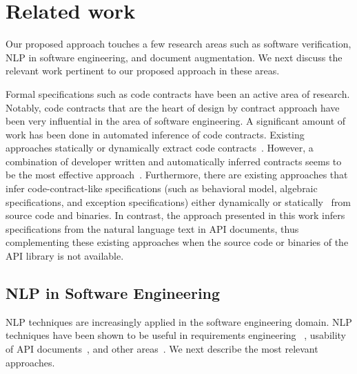 \section{Related work}
\label{sec:related}


Our proposed approach touches a few research areas such as software verification,
NLP in software engineering, and document augmentation.
We next discuss the relevant work pertinent to our proposed approach in these areas.

Formal specifications such as code contracts have been an active area of research. Notably, code contracts that are the heart of design by contract approach have been very influential in the area of software engineering.
A significant amount of work has been done in automated inference of code contracts.
Existing approaches statically or dynamically extract code contracts~\cite{csallner08dysy,NimmerE02:ISSTA,Tillmann:2006:DLM:2105385.2105433}. However, a combination of developer written and automatically inferred contracts seems to be the most effective approach~\cite{Polikarpova2009ISSTA,Flanagan2001:HAA}.
Furthermore, there are existing approaches that infer code-contract-like specifications
(such as behavioral model, algebraic specifications, and exception specifications) either dynamically\cite{Henkel07discoveringdocumentation,Ghezzi:2009:SIB:1555001.1555057,Henkel:2008:DDA:1363102.1363105} or statically~\cite{Flanagan2001:HAA,Buse:2008:ADI:1390630.1390664} from source code and binaries.
In contrast, the approach presented in this work infers specifications from the natural language text in API documents,
thus complementing these existing approaches when the source code or binaries of the API library is not available.


\subsection{NLP in Software Engineering}

NLP techniques are increasingly applied in the software engineering domain. 
NLP techniques have been shown to be useful in requirements engineering ~\cite{Sinha2009,Sinha2010,Gervasi2005},
usability of API documents~\cite{Dekel2009}, and other areas~\cite{Zhou2008,Little2009,pandita13:WHYPER}.
We next describe the most relevant approaches.


